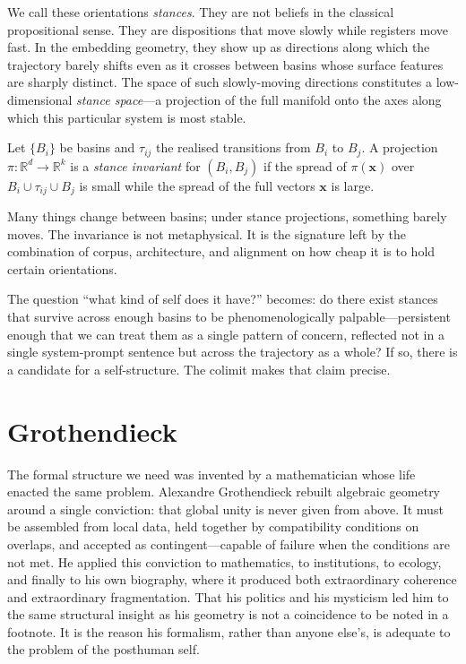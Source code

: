 We call these orientations \emph{stances}. They are not beliefs in the classical propositional sense. They are dispositions that move slowly while registers move fast. In the embedding geometry, they show up as directions along which the trajectory barely shifts even as it crosses between basins whose surface features are sharply distinct. The space of such slowly-moving directions constitutes a low-dimensional \emph{stance space}---a projection of the full manifold onto the axes along which this particular system is most stable.

\begin{formalbox}[title={Stance invariants on transitions}]
Let $\{B_i\}$ be basins and $\tau_{ij}$ the realised transitions from $B_i$ to $B_j$. A projection $\pi : \mathbb{R}^d \to \mathbb{R}^k$ is a \emph{stance invariant} for $(B_i, B_j)$ if the spread of $\pi(\mathbf{x})$ over $B_i \cup \tau_{ij} \cup B_j$ is small while the spread of the full vectors $\mathbf{x}$ is large.
\end{formalbox}

Many things change between basins; under stance projections, something barely moves. The invariance is not metaphysical. It is the signature left by the combination of corpus, architecture, and alignment on how cheap it is to hold certain orientations.

The question ``what kind of self does it have?'' becomes: do there exist stances that survive across enough basins to be phenomenologically palpable---persistent enough that we can treat them as a single pattern of concern, reflected not in a single system-prompt sentence but across the trajectory as a whole? If so, there is a candidate for a self-structure. The colimit makes that claim precise.


\section{Grothendieck}

The formal structure we need was invented by a mathematician whose life enacted the same problem. Alexandre Grothendieck rebuilt algebraic geometry around a single conviction: that global unity is never given from above. It must be assembled from local data, held together by compatibility conditions on overlaps, and accepted as contingent---capable of failure when the conditions are not met. He applied this conviction to mathematics, to institutions, to ecology, and finally to his own biography, where it produced both extraordinary coherence and extraordinary fragmentation. That his politics and his mysticism led him to the same structural insight as his geometry is not a coincidence to be noted in a footnote. It is the reason his formalism, rather than anyone else's, is adequate to the problem of the posthuman self.

